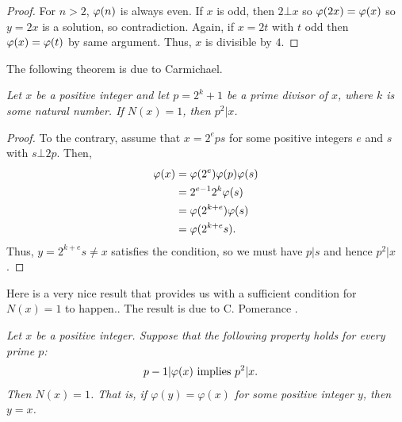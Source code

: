 \documentclass{subfile}
\begin{document}
		\begin{proof}
			For $n>2$, $\varphi (n)$ is always even. If $x$ is odd, then $2\bot x$ so $\varphi (2x)=\varphi (x)$ so $y=2x$ is a solution, so contradiction. Again, if $x=2t$ with $t$ odd then $\varphi (x)=\varphi (t)$ by same argument. Thus, $x$ is divisible by $4$.
		\end{proof}
	The following theorem is due to Carmichael.
	
		\begin{theorem} \slshape
			Let $x$ be a positive integer and let $p=2^k+1$ be a prime divisor of $x$, where $k$ is some natural number. If $N(x)=1$, then $p^2|x$.
		\end{theorem}
		
		\begin{proof}
			To the contrary, assume that $x=2^eps$ for some positive integers $e$ and $s$ with $s\bot 2p$. Then,
				\begin{align*}
					\varphi (x)  & = \varphi (2^e)\varphi (p)\varphi (s)\\
							& = 2^{e-1}2^k\varphi (s)\\
							& = \varphi (2^{k+e})\varphi (s)\\
							& = \varphi (2^{k+e}s).
				\end{align*}
			Thus, $y=2^{k+e}s\neq x$ satisfies the condition, so we must have $p|s$ and hence $p^2 | x$.
		\end{proof}
	Here is a very nice result that provides us with a sufficient condition for $N(x)=1$ to happen.. The result is due to C. Pomerance \cite{pomerance}.
		\begin{theorem}\slshape
			 Let $x$ be a positive integer. Suppose that the following property holds for every prime $p$:
				\begin{align*}
					p-1|\varphi (x)& \text{ implies } p^2|x.
				\end{align*}
			Then $N(x)=1$. That is, if $\varphi(y)=\varphi(x)$ for some positive integer $y$, then $y=x$.
		\end{theorem}
		
\end{document}
